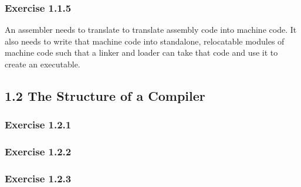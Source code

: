 \documentclass{article}
\begin{document}
\subsubsection*{Exercise 1.1.5}

An assembler needs to translate to translate assembly code into machine code. It also needs to write that machine code into standalone, relocatable modules of machine code such that a linker and loader can take that code and use it to create an executable.

\subsection*{1.2 The Structure of a Compiler}
\subsubsection*{Exercise 1.2.1}


\subsubsection*{Exercise 1.2.2}


\subsubsection*{Exercise 1.2.3}
\end{document}
